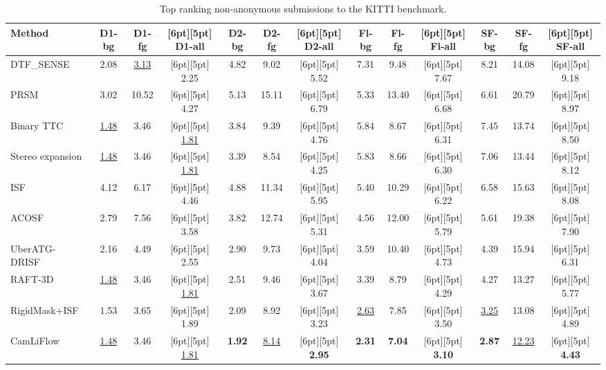 \documentclass[10pt,twocolumn,letterpaper]{article}
\begin{document}
\begin{table*}
\caption{Top ranking non-anonymous submissions to the KITTI benchmark.}
\label{tab:KITTI_results}
\begin{center}
\begin{tabular}{lcc>{\columncolor[gray]{0.95}[6pt][5pt]}c
                 cc>{\columncolor[gray]{0.95}[6pt][5pt]}c
                 cc>{\columncolor[gray]{0.95}[6pt][5pt]}c
                 cc>{\columncolor[gray]{0.95}[6pt][5pt]}c}
\toprule
Method & \!\!D1-bg\!\! & \!\!D1-fg\!\! & \!\!D1-all\!\! & \!\!D2-bg\!\! & \!\!D2-fg\!\! & \!\!D2-all\!\! & \!\!Fl-bg\!\! & \!\!Fl-fg\!\! & \!\!Fl-all\!\! & \!\!SF-bg\!\! & \!\!SF-fg\!\! & \!\!SF-all\\
\midrule
DTF\_SENSE~\cite{Schuster2021_DTF} & 2.08 & \underline{3.13} & 2.25 & 4.82 & 9.02 & 5.52 & 7.31 & 9.48 & 7.67 & 8.21 & 14.08 & 9.18
\\
PRSM~\cite{Vogel2015_PRSM} & 3.02 & 10.52 & 4.27 & 5.13 & 15.11 & 6.79 & 5.33 & 13.40 & 6.68 & 6.61 & 20.79 & 8.97
\\
Binary TTC~\cite{Badki2021_binaryTTC} & \underline{1.48} & 3.46 & \underline{1.81} & 3.84 & 9.39 & 4.76 & 5.84 & 8.67 & 6.31 & 7.45 & 13.74 & 8.50
\\
Stereo expansion~\cite{Yang2020_opticalexpansion}\!\!\! & \underline{1.48} & 3.46 & \underline{1.81} & 3.39 & 8.54 & 4.25 & 5.83 & 8.66 & 6.30 & 7.06 & 13.44 & 8.12
\\
ISF~\cite{Behl2017_ISF} & 4.12 & 6.17 & 4.46 & 4.88 & 11.34 & 5.95 & 5.40 & 10.29 & 6.22 & 6.58 & 15.63 & 8.08
\\
ACOSF~\cite{Li2021_acosf} & 2.79 & 7.56 & 3.58 & 3.82 & 12.74 & 5.31 & 4.56 & 12.00 & 5.79 & 5.61 & 19.38 & 7.90
\\
UberATG-DRISF~\cite{Ma2019_DRISF}\!\!\!\! & 2.16 & 4.49 & 2.55 & 2.90 & 9.73 & 4.04 & 3.59 & 10.40 & 4.73 & 4.39 & 15.94 & 6.31
\\
RAFT-3D~\cite{Teed2021_RAFT3D} & \underline{1.48} & 3.46 & \underline{1.81} & 2.51 & 9.46 & 3.67 & 3.39 & 8.79 & 4.29 & 4.27 & 13.27 & 5.77
\\
RigidMask+ISF~\cite{Yang2021_SegmentRigid}\!\!\! & 1.53 & 3.65 & 1.89 & 2.09 & 8.92 & 3.23 & \underline{2.63} & 7.85 & 3.50 & \underline{3.25} & 13.08 & 4.89
\\
CamLiFlow~\cite{Liu2022_camliflow} & \underline{1.48} & 3.46 & \underline{1.81} & \textbf{1.92} & \underline{8.14} & \textbf{2.95} & \textbf{2.31} & \textbf{7.04} & \textbf{3.10} & \textbf{2.87} & \underline{12.23} & \textbf{4.43}
\\

\end{tabular}
\end{center}
\end{table*}
\end{document}
